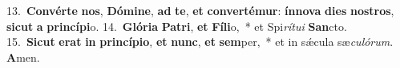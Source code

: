 {13.~}\textbf{Con}\textbf{vér}\textbf{te} \textbf{nos}, \textbf{Dó}\textbf{mi}\textbf{ne}, \textbf{ad} \textbf{te}, \textbf{et} \textbf{con}\textbf{ver}\textbf{té}\textbf{mur}: \textbf{ín}\textbf{no}\textbf{va} \textbf{di}\textbf{es} \textbf{no}\textbf{stros}, \textbf{si}\textbf{cut} \textbf{a} \textbf{prin}\textbf{cí}\textbf{pi}o.
{14.~}\textbf{Gló}\textbf{ri}\textbf{a} \textbf{Pa}\textbf{tri}, \textbf{et} \textbf{Fí}\textbf{li}o,~* et Spi\textit{rí}\textit{tu}\textit{i} \textbf{San}cto.\\
{15.~}\textbf{Si}\textbf{cut} \textbf{e}\textbf{rat} \textbf{in} \textbf{prin}\textbf{cí}\textbf{pi}\textbf{o}, \textbf{et} \textbf{nunc}, \textbf{et} \textbf{sem}per,~* et in sǽcula sæ\textit{cu}\textit{ló}\textit{rum}. \textbf{A}men.\\
